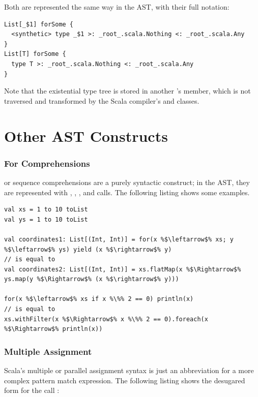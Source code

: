 Both are represented the same way in the AST, with their full notation:

\begin{lstlisting}
List[_$1] forSome { 
  <synthetic> type _$1 >: _root_.scala.Nothing <: _root_.scala.Any
}
List[T] forSome { 
  type T >: _root_.scala.Nothing <: _root_.scala.Any
}
\end{lstlisting}

Note that the existential type tree is stored in another 's  member, which is not traversed and transformed by the Scala compiler's  and  classes.

\section{Other AST Constructs} \label{section:other-ast-constructs}

\subsubsection*{For Comprehensions}

\noindent {} or sequence comprehensions are a purely syntactic construct; in the AST, they are represented with , , , and  calls. The following listing shows some examples. 

\begin{lstlisting}
val xs = 1 to 10 toList
val ys = 1 to 10 toList

val coordinates1: List[(Int, Int)] = for(x %$\leftarrow$% xs; y %$\leftarrow$% ys) yield (x %$\rightarrow$% y)
// is equal to
val coordinates2: List[(Int, Int)] = xs.flatMap(x %$\Rightarrow$% ys.map(y %$\Rightarrow$% (x %$\rightarrow$% y)))

for(x %$\leftarrow$% xs if x %\%% 2 == 0) println(x)
// is equal to
xs.withFilter(x %$\Rightarrow$% x %\%% 2 == 0).foreach(x %$\Rightarrow$% println(x))
\end{lstlisting}


\subsubsection*{Multiple Assignment}

\noindent Scala's multiple or parallel assignment syntax is just an abbreviation for a more complex pattern match expression. The following listing shows the desugared form for the call :

